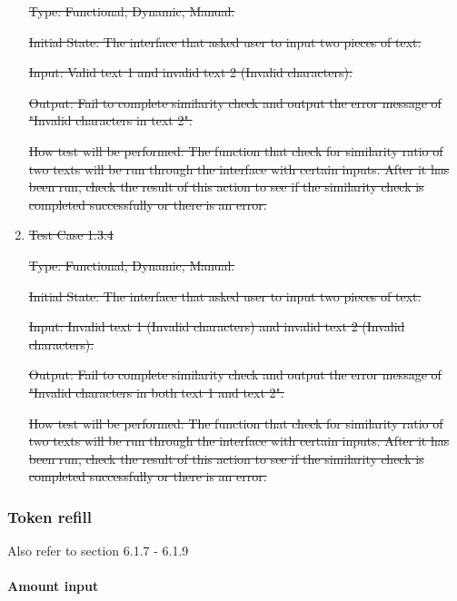 \documentclass[12pt, titlepage]{article}
\begin{document}
\begin{enumerate}
\st{Type: Functional, Dynamic, Manual.}
					
\st{Initial State: The interface that asked user to input two pieces of text.}
					
\st{Input: Valid text 1 and invalid text 2 (Invalid characters).}
					
\st{Output: Fail to complete similarity check and output the error message of "Invalid characters in text 2".}
					
\st{How test will be performed: The function that check for similarity ratio of two texts will be run through the interface with certain inputs. After it has been run, check the result of this action to see if the similarity check is completed successfully or there is an error.}

\item{\st{ Test Case 1.3.4}\\}

\st{ Type: Functional, Dynamic, Manual.}
					
\st{Initial State: The interface that asked user to input two pieces of text.}
					
\st{Input: Invalid text 1 (Invalid characters) and invalid text 2 (Invalid characters).}
					
\st{Output: Fail to complete similarity check and output the error message of "Invalid characters in both text 1 and text 2".}
					
\st{How test will be performed: The function that check for similarity ratio of two texts will be run through the interface with certain inputs. After it has been run, check the result of this action to see if the similarity check is completed successfully or there is an error.}

\end{enumerate}

\subsubsection{Token refill}
Also refer to section 6.1.7 - 6.1.9

\paragraph{Amount input}
\end{document}
